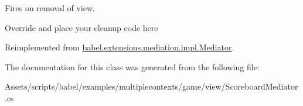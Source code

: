 Fires on removal of view. 

Override and place your cleanup code here 

Reimplemented from \hyperlink{classbabel_1_1extensions_1_1mediation_1_1impl_1_1_mediator_a8b818665eda883eac66c83b8468007e9}{babel.\-extensions.\-mediation.\-impl.\-Mediator}.



The documentation for this class was generated from the following file\-:\begin{DoxyCompactItemize}
\item 
Assets/scripts/babel/examples/multiplecontexts/game/view/Scoreboard\-Mediator.\-cs\end{DoxyCompactItemize}
